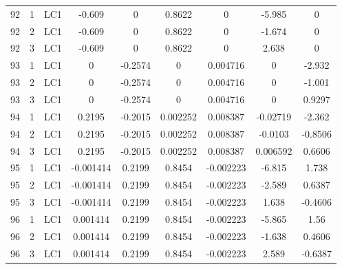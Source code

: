 \documentclass{article}%
\begin{document}
\begin{longtable}{| c c c | c c c c c c |}
92&1&LC1&{-}0.609&0&0.8622&0&{-}5.985&0\\%
92&2&LC1&{-}0.609&0&0.8622&0&{-}1.674&0\\%
92&3&LC1&{-}0.609&0&0.8622&0&2.638&0\\%
93&1&LC1&0&{-}0.2574&0&0.004716&0&{-}2.932\\%
93&2&LC1&0&{-}0.2574&0&0.004716&0&{-}1.001\\%
93&3&LC1&0&{-}0.2574&0&0.004716&0&0.9297\\%
94&1&LC1&0.2195&{-}0.2015&0.002252&0.008387&{-}0.02719&{-}2.362\\%
94&2&LC1&0.2195&{-}0.2015&0.002252&0.008387&{-}0.0103&{-}0.8506\\%
94&3&LC1&0.2195&{-}0.2015&0.002252&0.008387&0.006592&0.6606\\%
95&1&LC1&{-}0.001414&0.2199&0.8454&{-}0.002223&{-}6.815&1.738\\%
95&2&LC1&{-}0.001414&0.2199&0.8454&{-}0.002223&{-}2.589&0.6387\\%
95&3&LC1&{-}0.001414&0.2199&0.8454&{-}0.002223&1.638&{-}0.4606\\%
96&1&LC1&0.001414&0.2199&0.8454&{-}0.002223&{-}5.865&1.56\\%
96&2&LC1&0.001414&0.2199&0.8454&{-}0.002223&{-}1.638&0.4606\\%
96&3&LC1&0.001414&0.2199&0.8454&{-}0.002223&2.589&{-}0.6387\\%
\end{longtable}%
\newpage%
\end{document}
